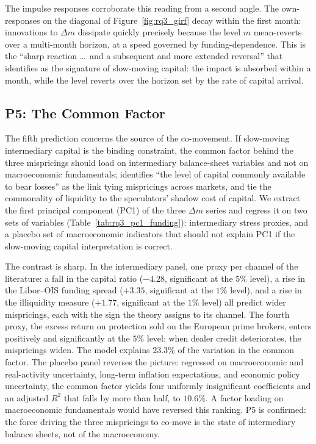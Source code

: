 The impulse responses corroborate this reading from a second angle.
The own-responses on the diagonal of Figure~\ref{fig:rq3_girf} decay
within the first month: innovations to $\Delta m$ dissipate quickly
precisely because the level $m$ mean-reverts over a multi-month
horizon, at a speed governed by funding-dependence. This is the
``sharp reaction \ldots\ and a subsequent and more extended reversal''
that \citet{duffie2010presidential} identifies as the signature of
slow-moving capital: the impact is absorbed within a month, while the
level reverts over the horizon set by the rate of capital arrival.



\subsection{P5: The Common Factor}
\label{sec:rq3_p5}

The fifth prediction concerns the source of the co-movement. If
slow-moving intermediary capital is the binding constraint, the common
factor behind the three mispricings should load on intermediary
balance-sheet variables and not on macroeconomic fundamentals;
\citet{duffie2010presidential} identifies ``the level of capital
commonly available to bear losses'' as the link tying mispricings
across markets, and \citet{brunnermeier2009market} tie the commonality
of liquidity to the speculators' shadow cost of capital. We extract the
first principal component (PC1) of the three $\Delta m$ series and
regress it on two sets of variables (Table~\ref{tab:rq3_pc1_funding}):
intermediary stress proxies, and a placebo set of macroeconomic
indicators that should not explain PC1 if the slow-moving capital
interpretation is correct.

The contrast is sharp. In the intermediary panel, one proxy per
channel of the literature: a fall in the \citet{he2017intermediary}
capital ratio ($-4.28$, significant at the $5\%$ level), a rise in
the Libor--OIS funding spread ($+3.35$, significant at the $1\%$
level), and a rise in the \citet{amihud2015pricing} illiquidity
measure ($+1.77$, significant at the $1\%$ level) all predict wider
mispricings, each with the sign the theory assigns to its channel.
The fourth proxy, the excess return on protection sold on the
European prime brokers, enters positively and significantly at the
$5\%$ level: when dealer credit deteriorates, the mispricings widen.
The model explains $23.3\%$ of the
variation in the common factor. The placebo panel reverses the
picture: regressed on macroeconomic and real-activity uncertainty,
long-term inflation expectations, and economic policy uncertainty,
the common factor yields four uniformly insignificant coefficients
and an adjusted $R^{2}$ that falls by more than half, to $10.6\%$. A
factor loading on macroeconomic fundamentals would have reversed this
ranking. P5 is confirmed: the force driving
the three mispricings to co-move is the state of intermediary balance
sheets, not of the macroeconomy.


